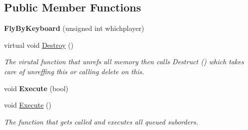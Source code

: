 \subsection*{Public Member Functions}
\begin{DoxyCompactItemize}
\item 
{\bfseries Fly\+By\+Keyboard} (unsigned int whichplayer)\hypertarget{classFlyByKeyboard_a2e39d59a2041a6007c4463e0185cb2b6}{}\label{classFlyByKeyboard_a2e39d59a2041a6007c4463e0185cb2b6}

\item 
virtual void \hyperlink{classFlyByKeyboard_ac8cbc6782ccc50f12bbd4536982ce3d4}{Destroy} ()\hypertarget{classFlyByKeyboard_ac8cbc6782ccc50f12bbd4536982ce3d4}{}\label{classFlyByKeyboard_ac8cbc6782ccc50f12bbd4536982ce3d4}

\begin{DoxyCompactList}\small\item\em The virutal function that unrefs all memory then calls Destruct () which takes care of unreffing this or calling delete on this. \end{DoxyCompactList}\item 
void {\bfseries Execute} (bool)\hypertarget{classFlyByKeyboard_ab631c0778ac648d00c03e3ce7b51df71}{}\label{classFlyByKeyboard_ab631c0778ac648d00c03e3ce7b51df71}

\item 
void \hyperlink{classFlyByKeyboard_ae58789080bb04455159fcb5f26c37b8f}{Execute} ()\hypertarget{classFlyByKeyboard_ae58789080bb04455159fcb5f26c37b8f}{}\label{classFlyByKeyboard_ae58789080bb04455159fcb5f26c37b8f}

\begin{DoxyCompactList}\small\item\em The function that gets called and executes all queued suborders. \end{DoxyCompactList}\end{DoxyCompactItemize}
